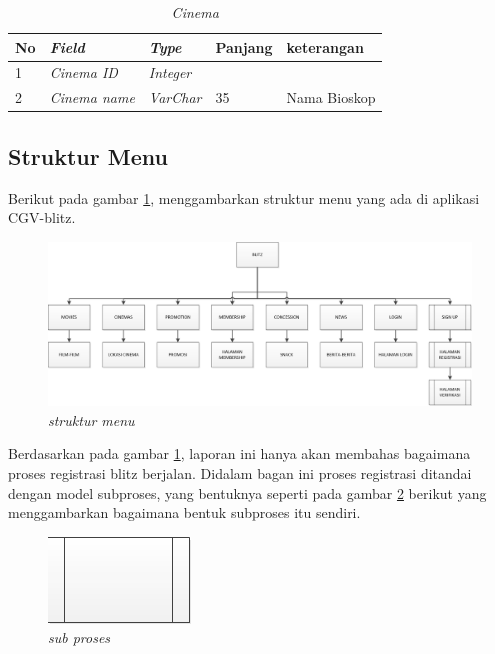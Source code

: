 \begin{table}[!htbp]
\captionsetup{singlelinecheck=off}
\caption{\textit{Cinema}}
\label{kamusdata4}
\begin{tabular}{|l|l|l|l|l|}
\hline
No & \textit{Field} & \textit{Type} & Panjang & keterangan \\
\hline

1 &  \textit{Cinema ID} & \textit{Integer}  &  &   \\

\hline

2 &  \textit{Cinema name} & \textit{VarChar} & 35 & Nama Bioskop \\
\hline

\end{tabular}
\end{table}


\subsection{Struktur Menu}
\par
Berikut pada gambar \ref{struktur}, menggambarkan struktur menu yang ada di aplikasi CGV-blitz.
\begin{figure}[!htbp]
    \centering
    \includegraphics[scale=0.5]{gambar/STRUKTUR}
    \caption{\textit{struktur menu}}
    \label{struktur}
\end{figure}

\par
Berdasarkan pada gambar \ref{struktur}, laporan ini hanya akan membahas bagaimana proses registrasi blitz berjalan. Didalam bagan ini proses registrasi ditandai dengan model subproses, yang bentuknya seperti pada gambar \ref{sub} berikut yang menggambarkan bagaimana bentuk subproses itu sendiri.

\begin{figure}[!htbp]
    \centering
    \includegraphics[scale=0.5]{gambar/sub}
    \caption{\textit{sub proses}}
    \label{sub}
\end{figure}
